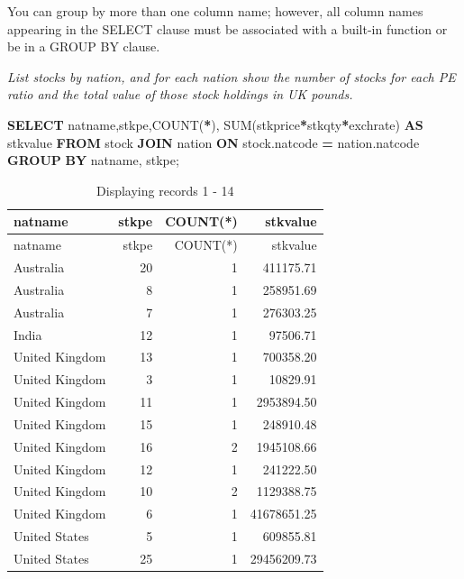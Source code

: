 \documentclass[
]{article}
\newenvironment{Shaded}{\begin{snugshade}}{\end{snugshade}}
\newcommand{\FunctionTok}[1]{\textcolor[rgb]{0.00,0.00,0.00}{#1}}
\newcommand{\KeywordTok}[1]{\textcolor[rgb]{0.13,0.29,0.53}{\textbf{#1}}}
\newcommand{\NormalTok}[1]{#1}
\newcommand{\OperatorTok}[1]{\textcolor[rgb]{0.81,0.36,0.00}{\textbf{#1}}}
\begin{document}
You can group by more than one column name; however, all column names
appearing in the SELECT clause must be associated with a built-in
function or be in a GROUP BY clause.

\emph{List stocks by nation, and for each nation show the number of
stocks for each PE ratio and the total value of those stock holdings in
UK pounds.}

\begin{Shaded}
\begin{Highlighting}[]
\KeywordTok{SELECT}\NormalTok{ natname,stkpe,}\FunctionTok{COUNT}\NormalTok{(}\OperatorTok{*}\NormalTok{),}
    \FunctionTok{SUM}\NormalTok{(stkprice}\OperatorTok{*}\NormalTok{stkqty}\OperatorTok{*}\NormalTok{exchrate) }\KeywordTok{AS}\NormalTok{ stkvalue}
        \KeywordTok{FROM}\NormalTok{ stock }\KeywordTok{JOIN}\NormalTok{ nation }\KeywordTok{ON}\NormalTok{ stock.natcode }\OperatorTok{=}\NormalTok{ nation.natcode}
            \KeywordTok{GROUP} \KeywordTok{BY}\NormalTok{ natname, stkpe;}
\end{Highlighting}
\end{Shaded}

\begin{longtable}[]{@{}lrrr@{}}
\caption{Displaying records 1 - 14}\tabularnewline
\toprule()
natname & stkpe & COUNT(*) & stkvalue \\
\midrule()
\endfirsthead
\toprule()
natname & stkpe & COUNT(*) & stkvalue \\
\midrule()
\endhead
Australia & 20 & 1 & 411175.71 \\
Australia & 8 & 1 & 258951.69 \\
Australia & 7 & 1 & 276303.25 \\
India & 12 & 1 & 97506.71 \\
United Kingdom & 13 & 1 & 700358.20 \\
United Kingdom & 3 & 1 & 10829.91 \\
United Kingdom & 11 & 1 & 2953894.50 \\
United Kingdom & 15 & 1 & 248910.48 \\
United Kingdom & 16 & 2 & 1945108.66 \\
United Kingdom & 12 & 1 & 241222.50 \\
United Kingdom & 10 & 2 & 1129388.75 \\
United Kingdom & 6 & 1 & 41678651.25 \\
United States & 5 & 1 & 609855.81 \\
United States & 25 & 1 & 29456209.73 \\
\bottomrule()
\end{longtable}
\end{document}
